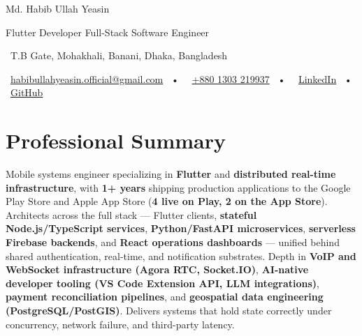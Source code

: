 \documentclass[10pt,letterpaper]{article}
\makeatletter
\newcommand{\Name}{Md. Habib Ullah Yeasin}
\newcommand{\Role}{Flutter Developer \textbar{} Full-Stack Software Engineer}
\newcommand{\Location}{T.B Gate, Mohakhali, Banani, Dhaka, Bangladesh}
\newcommand{\Email}{habibullahyeasin.official@gmail.com}
\newcommand{\Phone}{+880 1303 219937}
\newcommand{\LinkedIn}{https://linkedin.com/in/md-habib-ullah-yeasin}
\newcommand{\GitHub}{https://github.com/H-Yeasin}
\makeatother
\begin{document}
\begin{center}
    {\fontsize{23pt}{23pt}\selectfont \Name}\par
    \vspace{2pt}
    {\Large \textcolor{myblue}{\Role}}\par
    \small
    \faMapMarker*~\Location \par
    \vspace{2pt}
    \faEnvelope~\href{mailto:\Email}{\Email} ~•~
    \faPhone~\href{tel:\Phone}{\Phone} ~•~
    \faLinkedin~\href{\LinkedIn}{LinkedIn} ~•~
    \faGithub~\href{\GitHub}{GitHub}
\end{center}

\vspace{3pt}

\section{Professional Summary}
Mobile systems engineer specializing in \textbf{Flutter} and \textbf{distributed real-time infrastructure}, with \textbf{1+ years} shipping production applications to the Google Play Store and Apple App Store (\textbf{4 live on Play, 2 on the App Store}). Architects across the full stack — Flutter clients, \textbf{stateful Node.js/TypeScript services}, \textbf{Python/FastAPI microservices}, \textbf{serverless Firebase backends}, and \textbf{React operations dashboards} — unified behind shared authentication, real-time, and notification substrates. Depth in \textbf{VoIP and WebSocket infrastructure (Agora RTC, Socket.IO)}, \textbf{AI-native developer tooling (VS Code Extension API, LLM integrations)}, \textbf{payment reconciliation pipelines}, and \textbf{geospatial data engineering (PostgreSQL/PostGIS)}. Delivers systems that hold state correctly under concurrency, network failure, and third-party latency.
\vspace{5pt}

\end{document}
